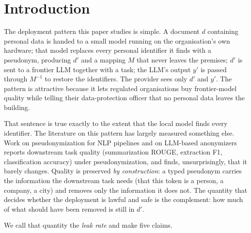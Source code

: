 \documentclass[11pt,a4paper]{article}
\newcommand{\dprime}{d'}
\begin{document}
\section{Introduction}
\label{sec:intro}

The deployment pattern this paper studies is simple. A document $d$ containing personal data is handed to a small model running on the organisation's own hardware; that model replaces every personal identifier it finds with a pseudonym, producing $\dprime$ and a mapping $M$ that never leaves the premises; $\dprime$ is sent to a frontier LLM together with a task; the LLM's output $y'$ is passed through $M^{-1}$ to restore the identifiers. The provider sees only $\dprime$ and $y'$. The pattern is attractive because it lets regulated organisations buy frontier-model quality while telling their data-protection officer that no personal data leaves the building.

That sentence is true exactly to the extent that the local model finds every identifier. The literature on this pattern has largely measured something else. Work on pseudonymization for NLP pipelines \citep{yermilov2023pseudonymization,chen2023has} and on LLM-based anonymizers \citep{staab2024anonymizers} reports downstream task quality (summarization ROUGE, extraction F1, classification accuracy) under pseudonymization, and finds, unsurprisingly, that it barely changes. Quality is preserved \emph{by construction}: a typed pseudonym carries the information the downstream task needs (that this token is a person, a company, a city) and removes only the information it does not. The quantity that decides whether the deployment is lawful and safe is the complement: how much of what should have been removed is still in $\dprime$.

We call that quantity the \emph{leak rate} and make five claims.
\end{document}

